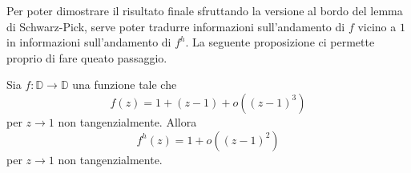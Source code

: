Per poter dimostrare il risultato finale sfruttando la versione al bordo del lemma di Schwarz-Pick, serve poter tradurre informazioni sull'andamento di $f$ vicino a $1$ in informazioni sull'andamento di $f^h$. La seguente proposizione ci permette proprio di fare queato passaggio.

\begin{prop} \label{o^3->o^2}
  Sia $f:\mathbb{D} \longrightarrow \mathbb{D}$ una funzione tale che
  \begin{equation} \label{o^3}
    f(z)=1+(z-1)+o((z-1)^3)
  \end{equation}
  per $z \longrightarrow 1$ non tangenzialmente. Allora
  \begin{equation} \label{o^2}
    f^h(z)=1+o((z-1)^2)
  \end{equation}
  per $z \longrightarrow 1$ non tangenzialmente.
\end{prop}

